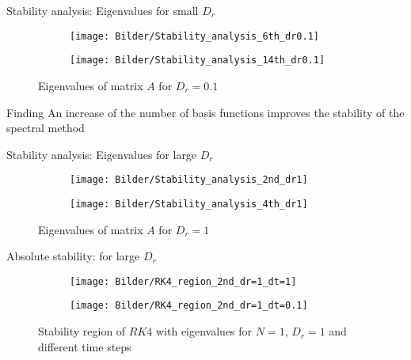 \begin{frame}{Stability analysis: Eigenvalues for small $D_r$}
	\begin{figure}
		\begin{subfigure}{0.48\textwidth}
			\texttt{[image: Bilder/Stability\_analysis\_6th\_dr0.1]}
		\end{subfigure}
		\hfill
		\begin{subfigure}{0.48\textwidth}
			\texttt{[image: Bilder/Stability\_analysis\_14th\_dr0.1]}
		\end{subfigure}
		\caption{Eigenvalues of matrix $A$ for $D_r = 0.1$}
	\end{figure}
	\begin{block}{Finding}
		An increase of the number of basis functions improves the stability of the spectral method
	\end{block}
\end{frame}

\begin{frame}{Stability analysis: Eigenvalues for large $D_r$}
	\begin{figure}
		\begin{subfigure}{0.48\textwidth}
			\texttt{[image: Bilder/Stability\_analysis\_2nd\_dr1]}
		\end{subfigure}
		\hfill
		\begin{subfigure}{0.48\textwidth}
			\texttt{[image: Bilder/Stability\_analysis\_4th\_dr1]}
		\end{subfigure}
		\caption{Eigenvalues of matrix $A$ for $D_r = 1$}
	\end{figure}
\end{frame}

\begin{frame}{Absolute stability: for large $D_r$}
	\begin{figure}
		\begin{subfigure}{0.48\textwidth}
			\texttt{[image: Bilder/RK4\_region\_2nd\_dr=1\_dt=1]}
		\end{subfigure}
		\hfill
		\begin{subfigure}{0.48\textwidth}
			\texttt{[image: Bilder/RK4\_region\_2nd\_dr=1\_dt=0.1]}
		\end{subfigure}
		\caption{Stability region of $RK4$ with eigenvalues for $N=1$, $D_r=1$ and different time steps}
	\end{figure}
\end{frame}

